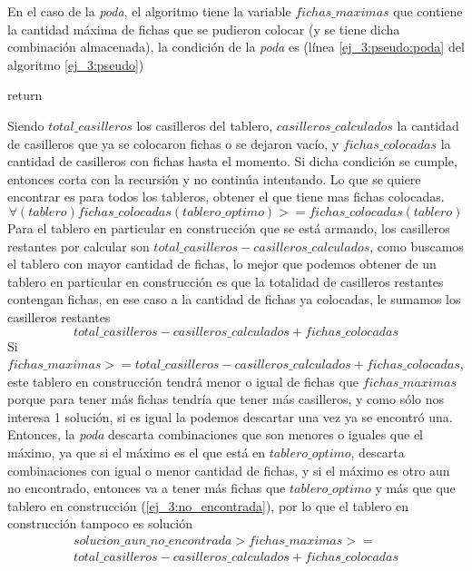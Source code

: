 En el caso de la \emph{poda}, el algoritmo tiene la variable $fichas\_maximas$ que contiene la cantidad m\'axima de fichas que se pudieron colocar (y se tiene dicha combinaci\'on almacenada), la condici\'on de la \emph{poda} es (l\'inea \ref{ej_3:pseudo:poda} del algoritmo \ref{ej_3:pseudo})
\begin{algorithmic}
		\State return
	\EndIf
\end{algorithmic}
Siendo $total\_casilleros$ los casilleros del tablero, $casilleros\_calculados$ la cantidad de casilleros que ya se colocaron fichas o se dejaron vac\'io, y $fichas\_colocadas$ la cantidad de casilleros con fichas hasta el momento. Si dicha condici\'on se cumple, entonces corta con la recursi\'on y no contin\'ua intentando.
Lo que se quiere encontrar es para todos los tableros, obtener el que tiene mas fichas colocadas.
\begin{equation}
	\forall (tablero) fichas\_colocadas(tablero\_optimo) >= fichas\_colocadas(tablero)
\end{equation}
Para el tablero en particular en construcci\'on que se est\'a armando, los casilleros restantes por calcular son $total\_casilleros - casilleros\_calculados$, como buscamos el tablero con mayor cantidad de fichas, lo mejor que podemos obtener de un tablero en particular en construcci\'on es que la totalidad de casilleros restantes contengan fichas, en ese caso a la cantidad de fichas ya colocadas, le sumamos los casilleros restantes
\begin{equation}
	total\_casilleros - casilleros\_calculados + fichas\_colocadas
\end{equation}
Si $fichas\_maximas >= total\_casilleros - casilleros\_calculados + fichas\_colocadas$, este tablero en construcci\'on tendr\'a menor o igual de fichas que $fichas\_maximas$ porque para tener m\'as fichas tendr\'ia que tener m\'as casilleros, y como s\'olo nos interesa 1 soluci\'on, si es igual la podemos descartar una vez ya se encontr\'o una. Entonces, la \emph{poda} descarta combinaciones que son menores o iguales que el m\'aximo, ya que si el m\'aximo es el que est\'a en $tablero\_optimo$,
descarta combinaciones con igual o menor cantidad de fichas, y si el m\'aximo es otro aun no encontrado, entonces va a tener m\'as fichas que $tablero\_optimo$ y m\'as que que tablero en construcci\'on (\ref{ej_3:no_encontrada}), por lo que el tablero en construcci\'on tampoco es soluci\'on
\begin{equation}
\begin{split}
	solucion\_aun\_no\_encontrada > fichas\_maximas >=\\
	total\_casilleros - casilleros\_calculados + fichas\_colocadas \label{ej_3:no_encontrada}
\end{split}
\end{equation}

